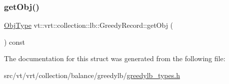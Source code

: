\subsubsection{\texorpdfstring{get\+Obj()}{getObj()}}
{\footnotesize\ttfamily \hyperlink{structvt_1_1vrt_1_1collection_1_1lb_1_1_greedy_record_a6b0754b2434fca9e865fa8422e3d709e}{Obj\+Type} vt\+::vrt\+::collection\+::lb\+::\+Greedy\+Record\+::get\+Obj (\begin{DoxyParamCaption}{ }\end{DoxyParamCaption}) const\hspace{0.3cm}{\ttfamily [inline]}}



The documentation for this struct was generated from the following file\+:\begin{DoxyCompactItemize}
\item 
src/vt/vrt/collection/balance/greedylb/\hyperlink{greedylb__types_8h}{greedylb\+\_\+types.\+h}\end{DoxyCompactItemize}
